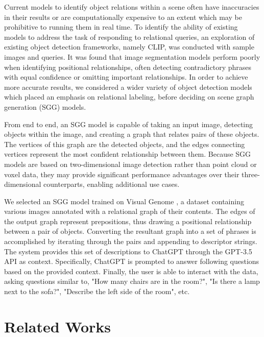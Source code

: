 \documentclass[letterpaper, 10 pt, conference]{ieeeconf}  %
\begin{document}
    Current models to identify object relations within a scene often have inaccuracies in their results or are computationally expensive to an extent which may be prohibitive to running them in real time. To identify the ability of existing models to address the task of responding to relational queries, an exploration of existing object detection frameworks, namely CLIP, was conducted with sample images and queries. It was found that image segmentation models perform poorly when identifying positional relationships, often detecting contradictory phrases with equal confidence or omitting important relationships. In order to achieve more accurate results, we considered a wider variety of object detection models which placed an emphasis on relational labeling, before deciding on scene graph generation (SGG) models.
    
    From end to end, an SGG model is capable of taking an input image, detecting objects within the image, and creating a graph that relates pairs of these objects. The vertices of this graph are the detected objects, and the edges connecting vertices represent the most confident relationship between them. Because SGG models are based on two-dimensional image detection rather than point cloud or voxel data, they may provide significant performance advantages over their three-dimensional counterparts, enabling additional use cases.
    
    We selected an SGG model trained on Visual Genome \cite{Krishna_Zhu_Groth_Johnson_Hata_Kravitz_Chen_Kalantidis_Li_Shamma_et_al._2017}, a dataset containing various images annotated with a relational graph of their contents. The edges of the output graph represent prepositions, thus drawing a positional relationship between a pair of objects. Converting the resultant graph into a set of phrases is accomplished by iterating through the pairs and appending to descriptor strings. The system provides this set of descriptions to ChatGPT through the GPT-3.5 API as context. Specifically, ChatGPT is prompted to answer following questions based on the provided context. Finally, the user is able to interact with the data, asking questions similar to, "How many chairs are in the room?", "Is there a lamp next to the sofa?", "Describe the left side of the room", etc.


\section{Related Works}
    
\end{document}
